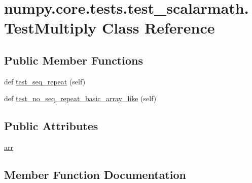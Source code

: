 \hypertarget{classnumpy_1_1core_1_1tests_1_1test__scalarmath_1_1TestMultiply}{}\section{numpy.\+core.\+tests.\+test\+\_\+scalarmath.\+Test\+Multiply Class Reference}
\label{classnumpy_1_1core_1_1tests_1_1test__scalarmath_1_1TestMultiply}
\subsection*{Public Member Functions}
\begin{DoxyCompactItemize}
\item 
def \hyperlink{classnumpy_1_1core_1_1tests_1_1test__scalarmath_1_1TestMultiply_adaa7e74b33ce56d5145776a4c7f5c973}{test\+\_\+seq\+\_\+repeat} (self)
\item 
def \hyperlink{classnumpy_1_1core_1_1tests_1_1test__scalarmath_1_1TestMultiply_ac74b8b07790eaeeff6408d657c6b3350}{test\+\_\+no\+\_\+seq\+\_\+repeat\+\_\+basic\+\_\+array\+\_\+like} (self)
\end{DoxyCompactItemize}
\subsection*{Public Attributes}
\begin{DoxyCompactItemize}
\item 
\hyperlink{classnumpy_1_1core_1_1tests_1_1test__scalarmath_1_1TestMultiply_a2f5c6bb72dece13f45b51217f3bd471e}{arr}
\end{DoxyCompactItemize}


\subsection{Member Function Documentation}
\mbox{\label{classnumpy_1_1core_1_1tests_1_1test__scalarmath_1_1TestMultiply_ac74b8b07790eaeeff6408d657c6b3350}} 
